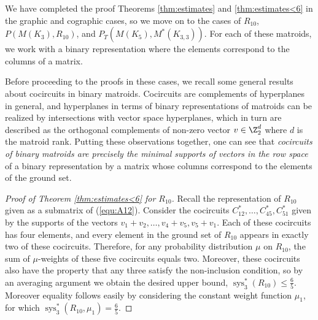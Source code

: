 \documentclass[reqno,12pt]{amsart}
\numberwithin{theorem}{section}
\theoremstyle{plain}
\theoremstyle{definition}
\theoremstyle{remark}
\numberwithin{equation}{section}
\numberwithin{table}{section}
\DeclareMathOperator{\sys}{sys}
\begin{document}
We have completed the proof Theorems \ref{thm:estimates} and \ref{thm:estimates<6} in the graphic and cographic cases, so we move on to the cases of $R_{10}$, $P(M(K_3), R_{10})$, and $P_T(M(K_5), M^*(K_{3,3}))$. For each of these matroids, we work with a binary representation where the elements correspond to the columns of a matrix. 

Before proceeding to the proofs in these cases, we recall some general results about cocircuits in binary matroids. Cocircuits are complements of hyperplanes in general, and hyperplanes in terms of binary representations of matroids can be realized by intersections with vector space hyperplanes, which in turn are described as the orthogonal complements of non-zero vector $v \in \Z_2^d$ where $d$ is the matroid rank. Putting these observations together, one can see that {\it cocircuits of binary matroids are precisely the minimal supports of vectors in the row space} of a binary representation by a matrix whose columns correspond to the elements of the ground set.

\begin{proof}[Proof of Theorem \ref{thm:estimates<6} for $R_{10}$]
Recall the representation of $R_{10}$ given as a submatrix of (\ref{equ:A12}). Consider the cocircuits $C_{12}^*, \ldots, C_{45}^*, C_{51}^*$ given by the supports of the vectors $v_1+v_2,\ldots,v_4+v_5, v_5 +v_1$. Each of these cocircuits has four elements, and every element in the ground set of $R_{10}$ appears in exactly two of these cocircuits. Therefore, for any probability distribution $\mu$ on $R_{10}$, the sum of $\mu$-weights of these five cocircuits equals two. Moreover, these cocircuits also have the property that any three satisfy the non-inclusion condition, so by an averaging argument we obtain the desired upper bound, $\sys_3^*(R_{10}) \leq \tfrac 6 5$. Moreover equality follows easily by considering the constant weight function $\mu_1$, for which $\sys_3^*(R_{10}, \mu_1) = \tfrac 6 5$.
\end{proof}
\end{document}
